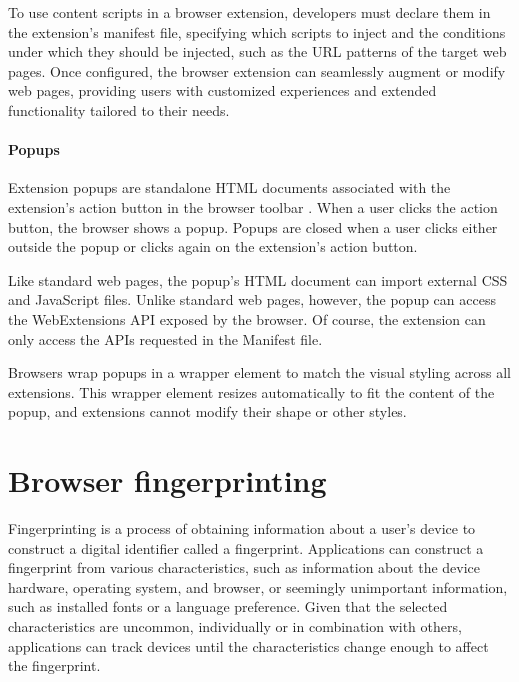 To use content scripts in a browser extension, developers must declare them in the extension's manifest file, specifying which scripts to inject and the conditions under which they should be injected, such as the URL patterns of the target web pages. Once configured, the browser extension can seamlessly augment or modify web pages, providing users with customized experiences and extended functionality tailored to their needs.

\subsubsection{Popups}

Extension popups are standalone HTML documents associated with the extension's action button in the browser toolbar \cite{ChromeWebExtensions}. When a user clicks the action button, the browser shows a popup. Popups are closed when a user clicks either outside the popup or clicks again on the extension's action button.

Like standard web pages, the popup's HTML document can import external CSS and JavaScript files. Unlike standard web pages, however, the popup can access the WebExtensions API exposed by the browser. Of course, the extension can only access the APIs requested in the Manifest file.

Browsers wrap popups in a wrapper element to match the visual styling across all extensions. This wrapper element resizes automatically to fit the content of the popup, and extensions cannot modify their shape or other styles.


\chapter{Browser fingerprinting}
\label{Chapter:BrowserFingerprinting}

Fingerprinting is a process of obtaining information about a user's device to construct a digital identifier called a fingerprint. Applications can construct a fingerprint from various characteristics, such as information about the device hardware, operating system, and browser, or seemingly unimportant information, such as installed fonts or a language preference. Given that the selected characteristics are uncommon, individually or in combination with others, applications can track devices until the characteristics change enough to affect the fingerprint.

